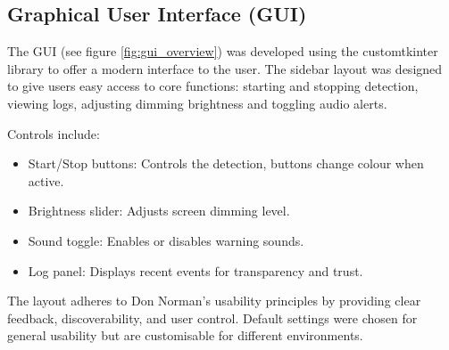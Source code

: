 \documentclass[12pt]{article}
\theoremstyle{plain}
\theoremstyle{definition}
\begin{document}
\subsection{Graphical User Interface (GUI)}

The GUI (see figure \ref{fig:gui_overview}) was developed using the customtkinter library to offer a modern interface to the user. The sidebar layout was designed to give users easy access to core functions: starting and stopping detection, viewing logs, adjusting dimming brightness and toggling audio alerts.

Controls include:
\begin{itemize}
  \item Start/Stop buttons: Controls the detection, buttons change colour when active.
  \item Brightness slider: Adjusts screen dimming level.
  \item Sound toggle: Enables or disables warning sounds.
  \item Log panel: Displays recent events for transparency and trust.
\end{itemize}

The layout adheres to Don Norman’s usability principles by providing clear feedback, discoverability, and user control. Default settings were chosen for general usability but are customisable for different environments.
\end{document}
